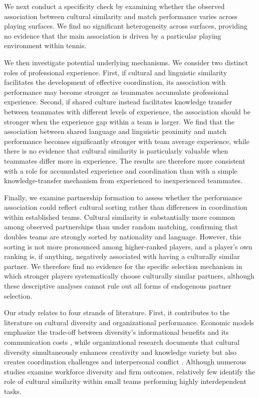 \documentclass[10pt]{article}
\begin{document}
We next conduct a specificity check by examining whether the observed association between cultural similarity and match performance varies across playing surfaces. We find no significant heterogeneity across surfaces, providing no evidence that the main association is driven by a particular playing environment within tennis. 

We then investigate potential underlying mechanisms. We consider two distinct roles of professional experience. First, if cultural and linguistic similarity facilitates the development of effective coordination, its association with performance may become stronger as teammates accumulate professional experience. Second, if shared culture instead facilitates knowledge transfer between teammates with different levels of experience, the association should be stronger when the experience gap within a team is larger. We find that the association between shared language and linguistic proximity and match performance becomes significantly stronger with team average experience, while there is no evidence that cultural similarity is particularly valuable when teammates differ more in experience. The results are therefore more consistent with a role for accumulated experience and coordination than with a simple knowledge-transfer mechanism from experienced to inexperienced teammates.

Finally, we examine partnership formation to assess whether the performance association could reflect cultural sorting rather than differences in coordination within established teams. Cultural similarity is substantially more common among observed partnerships than under random matching, confirming that doubles teams are strongly sorted by nationality and language. However, this sorting is not more pronounced among higher-ranked players, and a player's own ranking is, if anything, negatively associated with having a culturally similar partner. We therefore find no evidence for the specific selection mechanism in which stronger players systematically choose culturally similar partners, although these descriptive analyses cannot rule out all forms of endogenous partner selection.

 
Our study relates to four strands of literature. First, it contributes to the literature on cultural diversity and organizational performance. Economic models emphasize the trade-off between diversity's informational benefits and its communication costs \citep{lazear1999}, while organizational research documents that cultural diversity simultaneously enhances creativity and knowledge variety but also creates coordination challenges and interpersonal conflict \citep{stahl2010,harrisonklein2007}. Although numerous studies examine workforce diversity and firm outcomes, relatively few identify the role of cultural similarity within small teams performing highly interdependent tasks.
\end{document}
